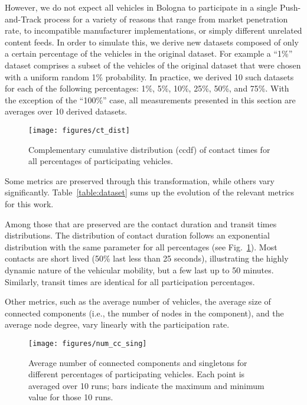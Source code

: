 \documentclass[preprint]{elsarticle}
\begin{document}
However, we do not expect all vehicles in Bologna to participate in a single Push-and-Track process for a variety of reasons that range from market penetration rate, to incompatible manufacturer implementations, or simply different unrelated content feeds. In order to simulate this, we derive new datasets composed of only a certain percentage of the vehicles in the original dataset. For example a ``1\%'' dataset comprises a subset of the vehicles of the original dataset that were chosen with a uniform random 1\% probability. In practice, we derived 10 such datasets for each of the following percentages: 1\%, 5\%, 10\%, 25\%, 50\%, and 75\%. With the exception of the ``100\%'' case, all measurements presented in this section are averages over 10 derived datasets.

\begin{figure}
  \centering
  \texttt{[image: figures/ct\_dist]}
  \caption{Complementary cumulative distribution (ccdf) of contact times for all percentages of participating vehicles.}
  \label{fig:ct_cdf}
\end{figure}

Some metrics are preserved through this transformation, while others vary significantly. Table~\ref{table:dataset} sums up the evolution of the relevant metrics for this work.

Among those that are preserved are the contact duration and transit times distributions. The distribution of contact duration follows an exponential distribution with the same parameter for all percentages (see Fig.~\ref{fig:ct_cdf}). Most contacts are short lived (50\% last less than 25 seconds), illustrating the highly dynamic nature of the vehicular mobility, but a few last up to 50 minutes. Similarly, transit times are identical for all participation percentages.

Other metrics, such as the average number of vehicles, the average size of connected components (i.e., the number of nodes in the component), and the average node degree, vary linearly with the participation rate.

\begin{figure}
  \centering
  \texttt{[image: figures/num\_cc\_sing]}
  \caption{Average number of connected components and singletons for different percentages of participating vehicles. Each point is averaged over 10 runs; bars indicate the maximum and minimum value for those 10 runs.}
  \label{fig:num_cc_sing}
\end{figure}
\end{document}
